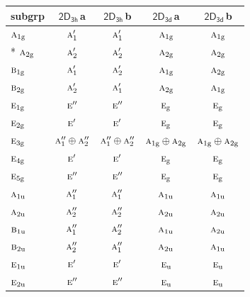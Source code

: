 \documentclass[10pt,a4paper]{article}
\numberwithin{equation}{section}
\newcommand{\grp}[1]{\mathsf{#1}}
\newcommand{\irr}[1]{\text{\normalfont\scshape #1}}
\newcommand{\ptag}[1]{\mathrm{#1}}
\newcommand{\clsletter}[1]{\,{\scriptsize\color{black!55}#1}}
\begin{document}
{\small\begin{longtable}{@{}lcccc@{}}\toprule
subgrp & \href{2D3h.pdf}{$\grp{2D_{3h}}$}\clsletter{a} & \href{2D3h.pdf}{$\grp{2D_{3h}}$}\clsletter{b} & \href{2D3d.pdf}{$\grp{2D_{3d}}$}\clsletter{a} & \href{2D3d.pdf}{$\grp{2D_{3d}}$}\clsletter{b}\\\midrule\endhead
\bottomrule\endfoot\endlastfoot
$\irr{a}_{1\ptag{g}}$ & $\irr{a}_{1}'$ & $\irr{a}_{1}'$ & $\irr{a}_{1\ptag{g}}$ & $\irr{a}_{1\ptag{g}}$\\*
$\irr{a}_{2\ptag{g}}$ & $\irr{a}_{2}'$ & $\irr{a}_{2}'$ & $\irr{a}_{2\ptag{g}}$ & $\irr{a}_{2\ptag{g}}$\\
$\irr{b}_{1\ptag{g}}$ & $\irr{a}_{1}'$ & $\irr{a}_{2}'$ & $\irr{a}_{1\ptag{g}}$ & $\irr{a}_{2\ptag{g}}$\\
$\irr{b}_{2\ptag{g}}$ & $\irr{a}_{2}'$ & $\irr{a}_{1}'$ & $\irr{a}_{2\ptag{g}}$ & $\irr{a}_{1\ptag{g}}$\\
$\irr{e}_{1\ptag{g}}$ & $\irr{e}''$ & $\irr{e}''$ & $\irr{e}_{\ptag{g}}$ & $\irr{e}_{\ptag{g}}$\\
$\irr{e}_{2\ptag{g}}$ & $\irr{e}'$ & $\irr{e}'$ & $\irr{e}_{\ptag{g}}$ & $\irr{e}_{\ptag{g}}$\\
$\irr{e}_{3\ptag{g}}$ & $\irr{a}_{1}''\oplus \irr{a}_{2}''$ & $\irr{a}_{1}''\oplus \irr{a}_{2}''$ & $\irr{a}_{1\ptag{g}}\oplus \irr{a}_{2\ptag{g}}$ & $\irr{a}_{1\ptag{g}}\oplus \irr{a}_{2\ptag{g}}$\\
$\irr{e}_{4\ptag{g}}$ & $\irr{e}'$ & $\irr{e}'$ & $\irr{e}_{\ptag{g}}$ & $\irr{e}_{\ptag{g}}$\\
$\irr{e}_{5\ptag{g}}$ & $\irr{e}''$ & $\irr{e}''$ & $\irr{e}_{\ptag{g}}$ & $\irr{e}_{\ptag{g}}$\\
$\irr{a}_{1\ptag{u}}$ & $\irr{a}_{1}''$ & $\irr{a}_{1}''$ & $\irr{a}_{1\ptag{u}}$ & $\irr{a}_{1\ptag{u}}$\\
$\irr{a}_{2\ptag{u}}$ & $\irr{a}_{2}''$ & $\irr{a}_{2}''$ & $\irr{a}_{2\ptag{u}}$ & $\irr{a}_{2\ptag{u}}$\\
$\irr{b}_{1\ptag{u}}$ & $\irr{a}_{1}''$ & $\irr{a}_{2}''$ & $\irr{a}_{1\ptag{u}}$ & $\irr{a}_{2\ptag{u}}$\\
$\irr{b}_{2\ptag{u}}$ & $\irr{a}_{2}''$ & $\irr{a}_{1}''$ & $\irr{a}_{2\ptag{u}}$ & $\irr{a}_{1\ptag{u}}$\\
$\irr{e}_{1\ptag{u}}$ & $\irr{e}'$ & $\irr{e}'$ & $\irr{e}_{\ptag{u}}$ & $\irr{e}_{\ptag{u}}$\\
$\irr{e}_{2\ptag{u}}$ & $\irr{e}''$ & $\irr{e}''$ & $\irr{e}_{\ptag{u}}$ & $\irr{e}_{\ptag{u}}$\\

\end{longtable}}
\end{document}
